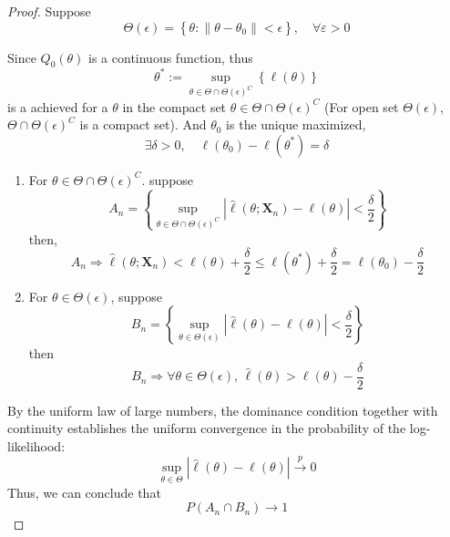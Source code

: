 \begin{proof}
	Suppose
	\begin{equation*}
		\Theta(\epsilon)=\left\{\theta:\left\|\theta-\theta_{0}\right\|<\epsilon\right\},\quad\forall\varepsilon>0
	\end{equation*}

	Since $Q_{0}(\theta)$ is a continuous function, thus
	\begin{equation*}
		\theta^{*}:=\sup_{\theta\in\Theta\cap \Theta(\epsilon)^{C}}\left\{\ell(\theta)\right\}
	\end{equation*}
	is a achieved for a $\theta$ in the compact set $\theta\in\Theta\cap \Theta(\epsilon)^{C}$ (For open set $\Theta(\epsilon)$, $\Theta\cap\Theta(\epsilon)^{C}$ is a compact set). And $\theta_{0}$ is the unique maximized,
	\begin{equation*}
		\exists\delta>0,\quad\ell\left(\theta_{0}\right)-\ell\left(\theta^{*}\right)=\delta
	\end{equation*}

	\begin{enumerate}
		\item For $\theta\in\Theta\cap\Theta(\epsilon)^{C}$. suppose
		      \begin{equation*}
			      A_{n}=\left\{\sup_{\theta\in\Theta\cap\Theta(\epsilon)^{C}}\left|\hat{\ell}\left(\theta;\textbf{X}_{n}\right)-\ell(\theta)\right|<\frac{\delta}{2}\right\}
		      \end{equation*}
		      then,
		      \begin{equation*}
			      A_{n}\Longrightarrow\hat{\ell}\left(\theta;\textbf{X}_{n}\right)<\ell(\theta)+\frac{\delta}{2}\leq \ell\left(\theta^{*}\right)+\frac{\delta}{2}=\ell\left(\theta_{0}\right)-\frac{\delta}{2}
		      \end{equation*}
		\item For $\theta\in\Theta(\epsilon)$, suppose
		      \begin{equation*}
			      B_{n}=\left\{\sup_{\theta\in\Theta(\epsilon)}\left|\hat{\ell}\left(\theta\right)-\ell(\theta)\right|<\frac{\delta}{2}\right\}
		      \end{equation*}
		      then
		      \begin{equation*}
			      B_{n}\Longrightarrow\forall\theta\in\Theta(\epsilon),\,\hat{\ell}\left(\theta\right)>\ell(\theta)-\frac{\delta}{2}
		      \end{equation*}
	\end{enumerate}

	By the uniform law of large numbers, the dominance condition together with continuity establishes the uniform convergence in the probability of the log-likelihood:
	\begin{equation*}
		\sup_{\theta\in\Theta}|\hat{\ell}(\theta)-\ell(\theta)|\stackrel{p}{\rightarrow}0
	\end{equation*}
	Thus, we can conclude that
	\begin{equation*}
		P\left(A_{n}\cap B_{n}\right)\rightarrow 1
	\end{equation*}


\end{proof}
